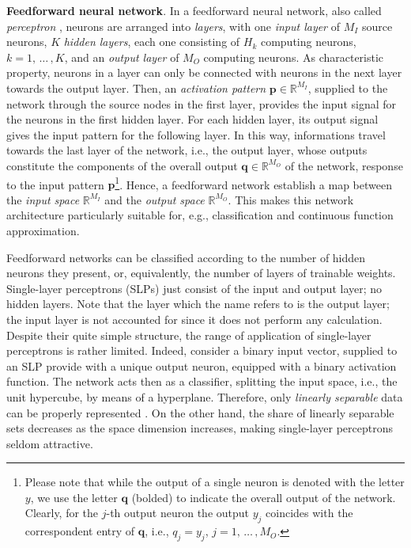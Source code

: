 \documentclass[12pt, a4paper, twoside, openright]{report}
\numberwithin{equation}{chapter}
\theoremstyle{theorem}
\theoremstyle{definition}
\theoremstyle{remark}
\theoremstyle{proposition}
\numberwithin{figure}{chapter}
\begin{document}
		\noindent \textbf{Feedforward neural network}. In a feedforward neural network, also called \emph{perceptron} \cite{Ros58}, neurons are arranged into \emph{layers}, with one \emph{input layer} of $M_I$ source neurons, $K$ \emph{hidden layers}, each one consisting of $H_k$ computing neurons, $k = 1, \, \ldots \, , K$, and an \emph{output layer} of $M_O$ computing neurons. As characteristic property, neurons in a layer can only be connected with neurons in the next layer towards the output layer. Then, an \emph{activation pattern} $\boldsymbol{p} \in \mathbb{R}^{M_I}$, supplied to the network through the source nodes in the first layer, provides the input signal for the neurons in the first hidden layer. For each hidden layer, its output signal gives the input pattern for the following layer. In this way, informations travel towards the last layer of the network, i.e., the output layer, whose outputs constitute the components of the overall output $\boldsymbol{q} \in \mathbb{R}^{M_O}$ of the network, response to the input pattern $\boldsymbol{p}$\footnote{Please note that while the output of a single neuron is denoted with the letter $y$, we use the letter $\boldsymbol{q}$ (bolded) to indicate the overall output of the network. Clearly, for the $j$-th output neuron the output $y_j$ coincides with the correspondent entry of $\boldsymbol{q}$, i.e., $q_j = y_j$, $j = 1, \, \ldots \, , M_O$.}. Hence, a feedforward network establish a map between the \emph{input space} $\mathbb{R}^{M_I}$ and the \emph{output space} $\mathbb{R}^{M_O}$. This makes this network architecture particularly suitable for, e.g., classification and continuous function approximation.
		
		Feedforward networks can be classified according to the number of hidden neurons they present, or, equivalently, the number of layers of trainable weights. Single-layer perceptrons (SLPs) just consist of the input and output layer; no hidden layers. Note that the layer which the name refers to is the output layer; the input layer is not accounted for since it does not perform any calculation. Despite their quite simple structure, the range of application of single-layer perceptrons is rather limited. Indeed, consider a binary input vector, supplied to an SLP provide with a unique output neuron, equipped with a binary activation function. The network acts then as a classifier, splitting the input space, i.e., the unit hypercube, by means of a hyperplane. Therefore, only \emph{linearly separable} data can be properly represented \cite{Kri}. On the other hand, the share of linearly separable sets decreases as the space dimension increases, making single-layer perceptrons seldom attractive.
		
\end{document}
